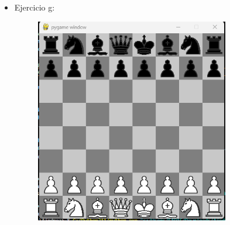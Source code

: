 \documentclass{article}
\begin{document}
  \begin{itemize}
		\item Ejercicio g:
	\begin{figure}[H]
		\centering
		\includegraphics[width=0.8\textwidth,keepaspectratio]{img/ejercicio2g.png}
	\end{figure}
	\end{itemize}
 \item 
\end{document}
